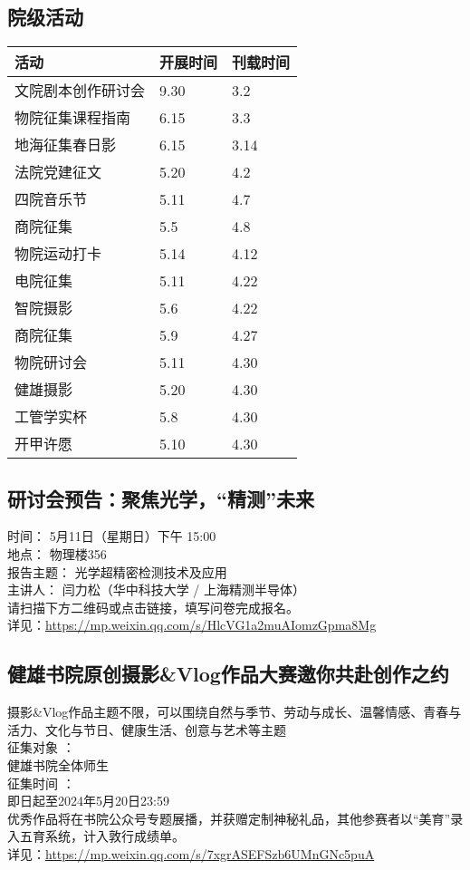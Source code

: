 \documentclass[letterpaper, 12pt]{article}
\begin{document}
\begin{multicols}{2}
\section{院级活动}
\begin{tabular}{|>{\centering\arraybackslash}m{}|m{}|m{}|}
\hline
    活动 & 开展时间 & 刊载时间\\
    \hline\hline
    文院剧本创作研讨会 & 9.30 & 3.2\\
    物院征集课程指南 & 6.15 & 3.3\\
    地海征集春日影 & 6.15 & 3.14\\
    法院党建征文 & 5.20 & 4.2\\
    四院音乐节 & 5.11 & 4.7\\
    商院征集 & 5.5 & 4.8\\
    物院运动打卡 & 5.14 & 4.12\\
    电院征集 & 5.11 & 4.22\\
    智院摄影 & 5.6 & 4.22\\
    商院征集 & 5.9 & 4.27\\
    物院研讨会 & 5.11 & 4.30\\
    健雄摄影 & 5.20 & 4.30\\
    工管学实杯 & 5.8 & 4.30\\
    开甲许愿 & 5.10 & 4.30\\
    \hline
\end{tabular}
\subsection{研讨会预告：聚焦光学，“精测”未来} %
时间： 5月11日（星期日）下午 15:00
\\地点： 物理楼356
\\报告主题： 光学超精密检测技术及应用
\\主讲人： 闫力松（华中科技大学 / 上海精测半导体）
\\请扫描下方二维码或点击链接，填写问卷完成报名。
\\详见：\url{https://mp.weixin.qq.com/s/HlcVG1a2muAIomzGpma8Mg}

\subsection{健雄书院原创摄影\&Vlog作品大赛邀你共赴创作之约} %
摄影\&Vlog作品主题不限，可以围绕自然与季节、劳动与成长、温馨情感、青春与活力、文化与节日、健康生活、创意与艺术等主题
\\征集对象 ：
\\健雄书院全体师生
\\征集时间 ：
\\即日起至2024年5月20日23:59
\\优秀作品将在书院公众号专题展播，并获赠定制神秘礼品，其他参赛者以“美育”录入五育系统，计入敦行成绩单。
\\详见：\url{https://mp.weixin.qq.com/s/7xgrASEFSzb6UMnGNc5puA}


\end{multicols}
\end{document}
